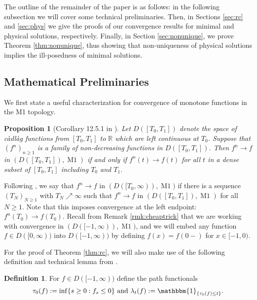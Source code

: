 \documentclass[12pt]{amsart}
\newcommand{\R}{\mathbb{R}}
\newcommand{\ind}{\mathbbm{1}}
\theoremstyle{plain}
\newtheorem{prop}[thm]{Proposition}
\theoremstyle{definition}
\newtheorem{defn}[thm]{Definition}
\begin{document}
\medskip

The outline of the remainder of the paper is as follows: in the following subsection we will cover some technical preliminaries. Then, in Sections \ref{sec:rc} and \ref{sec:phys} we give the proofs of our convergence results for minimal and physical solutions, respectively. Finally, in Section \ref{sec:nonunique}, we prove Theorem \ref{thm:nonunique}, thus showing that non-uniqueness of physical solutions implies the ill-posedness of minimal solutions.

\subsection{Mathematical Preliminaries}

We first state a useful characterization for convergence of monotone functions in the M1 topology. 

\begin{prop}[Corollary 12.5.1 in \cite{whitt_stochastic-process_2002}]\label{prop:M1conv}
Let $D([T_0,T_1])$ denote the space of c\`adl\`ag functions from $[T_0,T_1]$ to $\R$ which are left continuous at $T_0$. Suppose that $(f^n)_{n\ge 1}$ is a family of non-decreasing functions in $D([T_0,T_1])$. Then $f^n\to f$ in $(D([T_0,T_1]),\operatorname{M1})$ if and only if $f^n(t)\to f(t)$ for all $t$ in a dense subset of $[T_0,T_1]$ including $T_0$ and $T_1$.
\end{prop}

Following \cite{whitt_stochastic-process_2002}, we say that $f^n\to f$ in $(D([T_0,\infty)),\operatorname{M1})$ if there is a sequence $(T_N)_{N\ge1}$ with $T_N\nearrow\infty$ such that $f^n\to f$ in $(D([T_0,T_1]),\operatorname{M1})$ for all $N\ge 1$. Note that this imposes convergence at the left endpoint: $f^n(T_0)\to f(T_0)$. 
Recall from Remark \ref{rmk:cheaptrick} that we are working with convergence in $(D([-1,\infty)),\operatorname{M1})$, and we will embed any function $f\in D([0,\infty))$ into $D([-1,\infty))$ by defining $f(x)=f(0-)$ for $x\in [-1,0)$.

\medskip

For the proof of Theorem \ref{thm:rc}, we will also make use of the following definition and technical lemma from \cite[Definition 5.1 and Lemma 5.4]{cuchiero_propagation_2020}.

\begin{defn}
For $f\in D([-1,\infty))$ define the path functionals
\begin{align}
    \tau_0(f):=\inf\{s\ge 0: f_s\le 0\}\text{ and }\lambda_t(f):=\ind_{\{\tau_0(f)\le t\}}.
\end{align}
\end{defn}
\end{document}
